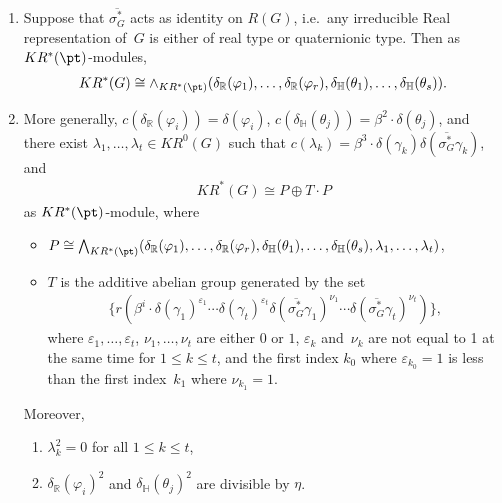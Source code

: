\begin{Theorem}[{\cite[Theorem 5.6]{Se}}]
\label{krtheorymodofg}\quad
\begin{enumerate}\itemsep=0pt
\item[$1.$]
Suppose that $\overline{\sigma_G^*}$ acts as identity on $R(G)$, i.e.\
any irreducible Real representation of~$G$ is either of real type or quaternionic type.
Then as $KR^*(\pt)$-modules,
\begin{gather*}
KR^*(G)\cong\wedge_{KR^*(\pt)}(\delta_\mathbb{R}(\varphi_1), \dots, \delta_\mathbb{R}(\varphi_r),
\delta_\mathbb{H}(\theta_1), \dots, \delta_\mathbb{H}(\theta_s)).
\end{gather*}
\item[$2.$]
More generally, $c(\delta_\mathbb{R}(\varphi_i))=\delta(\varphi_i)$,
$c(\delta_\mathbb{H}(\theta_j))=\beta^2\cdot\delta(\theta_j)$, and there exist $\lambda_1, \dots, \lambda_t\in KR^0(G)$
such that $c(\lambda_k)=\beta^3\cdot\delta(\gamma_k)\delta(\overline{\sigma_G^*}
\gamma_k)$, and
\begin{gather*}
KR^*(G)\cong P\oplus T\cdot P
\end{gather*}
as $KR^*(\pt)$-module, where
\begin{itemize}\itemsep=0pt
\item
$P\cong\bigwedge_{KR^*(\pt)}(\delta_\mathbb{R}(\varphi_1), \dots, \delta_\mathbb{R}(\varphi_r),
\delta_\mathbb{H}(\theta_1), \dots, \delta_\mathbb{H}(\theta_s), \lambda_1, \dots, \lambda_t)$,
\item
$T$ is the additive abelian group generated by the set
\begin{gather*}
\{r(\beta^i\cdot\delta(\gamma_1)^{\varepsilon_1}\cdots\delta(\gamma_t)^{\varepsilon_t}\delta(\overline{\sigma_G^*}
\gamma_1)^{\nu_1}\cdots\delta(\overline{\sigma_G^*}\gamma_t)^{\nu_t})\},
\end{gather*}
where $\varepsilon_1, \dots, \varepsilon_t$, $\nu_1, \dots, \nu_t$ are either $0$ or $1$, $\varepsilon_k$ and~$\nu_k$ are not
equal to 1 at the same time for $1\leq k\leq t$, and the first index $k_0$ where $\varepsilon_{k_0}=1$ is less than the
first index~$k_1$ where $\nu_{k_1}=1$.
\end{itemize}
Moreover,
\begin{enumerate}\itemsep=0pt
\item[$(a)$]
$\lambda_k^2=0$ for all $1\leq k\leq t$,
\item[$(b)$]
$\delta_\mathbb{R}(\varphi_i)^2$ and $\delta_\mathbb{H}(\theta_j)^2$ are divisible by $\eta$.
\end{enumerate}
\end{enumerate}
\end{Theorem}

